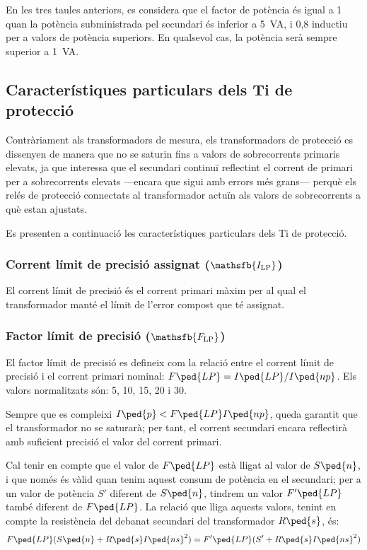 En les tres taules anteriors, es considera que el factor de
potència és igual a 1 quan la potència subministrada pel secundari és inferior a \qty{5}{VA}, i 0,8 inductiu per a valors de potència superiors. En qualsevol cas, la potència serà sempre superior a \qty{1}{VA}.


\subsection{Característiques particulars dels Ti de protecció}

Contràriament als transformadors de mesura, els transformadors de
protecció es dissenyen de manera que no se saturin fins a  valors
de sobrecorrents primaris elevats, ja que interessa que el
secundari continuï reflectint el corrent de primari per a
 sobrecorrents elevats ---encara que sigui amb errors més grans--- perquè els relés de protecció connectats al transformador actuïn
als valors de sobrecorrents a què estan ajustats.

Es presenten a continuació les característiques particulars dels Ti
de protecció.

\subsubsection{Corrent límit de precisió assignat ($\mathsfb{I_\text{LP}}$)}

El corrent
límit de precisió és el corrent primari màxim per al qual el transformador manté el límit
de l'error compost que té assignat.

\subsubsection{Factor límit de precisió ($\mathsfb{F_\text{LP}}$) }

 El factor límit de precisió
es defineix com la relació entre el corrent límit de precisió
i el corrent primari nominal: $F\ped{LP} = I\ped{LP} /I\ped{np}$.
Els valors normalitzats són: 5, 10, 15, 20 i 30.

Sempre que es compleixi  $I\ped{p}<F\ped{LP} I\ped{np}$, queda garantit
que el transformador no se saturarà; per tant, el corrent
secundari encara reflectirà amb suficient precisió el valor del corrent primari.

Cal tenir en compte que el valor de $F\ped{LP}$ està lligat
 al valor de $S\ped{n}$, i que només és vàlid
quan tenim aquest consum de  potència en el secundari; per a un
valor de potència $S'$ diferent de $S\ped{n}$, tindrem un valor
$F'\ped{LP}$ també diferent de  $F\ped{LP}$. La relació que
lliga aquests valors, tenint en compte la resistència del debanat
secundari del transformador  $R\ped{s}$, és:
\begin{equation}\label{eq:flp}
    F\ped{LP} (S\ped{n}+R\ped{s}I\ped{ns}^2) =
    F'\ped{LP} (S'+R\ped{s}I\ped{ns}^2)
\end{equation}

